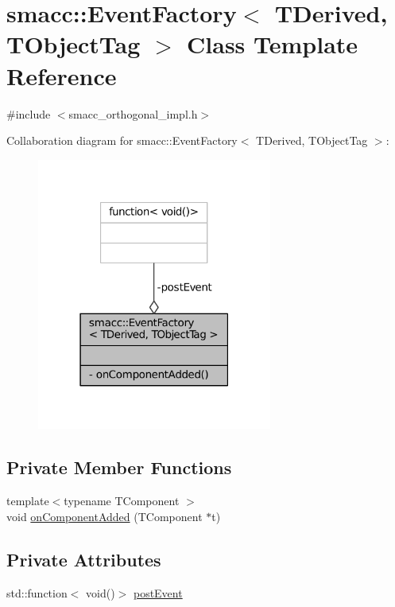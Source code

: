 \hypertarget{classsmacc_1_1EventFactory}{}\section{smacc\+:\+:Event\+Factory$<$ T\+Derived, T\+Object\+Tag $>$ Class Template Reference}
\label{classsmacc_1_1EventFactory}


{\ttfamily \#include $<$smacc\+\_\+orthogonal\+\_\+impl.\+h$>$}



Collaboration diagram for smacc\+:\+:Event\+Factory$<$ T\+Derived, T\+Object\+Tag $>$\+:
\nopagebreak
\begin{figure}[H]
\begin{center}
\leavevmode
\includegraphics[width=219pt]{classsmacc_1_1EventFactory__coll__graph}
\end{center}
\end{figure}
\subsection*{Private Member Functions}
\begin{DoxyCompactItemize}
\item 
{\footnotesize template$<$typename T\+Component $>$ }\\void \hyperlink{classsmacc_1_1EventFactory_a394d4e1f425d841e72619270cc6b874a}{on\+Component\+Added} (T\+Component $\ast$t)
\end{DoxyCompactItemize}
\subsection*{Private Attributes}
\begin{DoxyCompactItemize}
\item 
std\+::function$<$ void()$>$ \hyperlink{classsmacc_1_1EventFactory_ac0b34b9a502aca2c5614f0d45c0a9a58}{post\+Event}
\end{DoxyCompactItemize}


